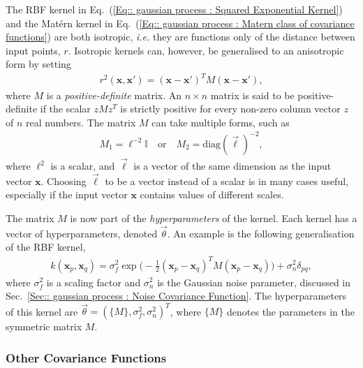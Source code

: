 \documentclass[twoside,english]{uiofysmaster}
\begin{document}
{{The RBF kernel in Eq.~(\ref{Eq:: gaussian process : Squared Exponential Kernel}) and the Mat\'{e}rn kernel in Eq.~(\ref{Eq:: gaussian process : Matern class of covariance functions}) are both isotropic, \textit{i.e.} they are functions only of the distance between input points, $r$. Isotropic kernels can, however, be generalised to an anisotropic form by setting
\begin{align}
r^2(\textbf{x}, \textbf{x}') = (\textbf{x} - \textbf{x}')^T M(\textbf{x} - \textbf{x}'),
\end{align}
where $M$ is a \textit{positive-definite} matrix. An $n \times n$ matrix is said to be positive-definite if the scalar $zMz^T$ is strictly positive for every non-zero column vector $z$ of $n$ real numbers. The matrix $M$ can take multiple forms, such as 
\begin{align}
M_1 = \ell^{-2} \mathbb{I} \quad \mathrm{or} \quad M_2 = \text{diag}(\vec{\ell})^{-2},
\end{align}
where $\ell^2$ is a scalar, and $\vec{\ell}$ is a vector of the same dimension as the input vector $\textbf{x}$. Choosing $\vec{\ell}$ to be a vector instead of a scalar is in many cases useful, especially if the input vector $\textbf{x}$ contains values of different scales.

The matrix $M$ is now part of the \textit{hyperparameters} of the kernel. Each kernel has a vector of hyperparameters, denoted $\vec{\theta}$. An example is the following generalisation of the RBF kernel, 
\begin{align}\label{Eq:: gaussian process : General RBF kernel}
k(\textbf{x}_p, \textbf{x}_q) = \sigma_f^2 \exp \big(- \frac{1}{2} (\textbf{x}_p - \textbf{x}_q)^T M (\textbf{x}_p - \textbf{x}_q) \big) + \sigma_n^2 \delta_{pq},
\end{align}
where $\sigma_f^2$ is a scaling factor and $\sigma_n^2$ is the Gaussian noise parameter, discussed in Sec.~\ref{Sec:: gaussian process : Noise Covariance Function}. The hyperparameters of this kernel are $\vec{\theta} = (\{M\}, \sigma^2_f, \sigma_n^2)^T$, where $\{M\}$ denotes the parameters in the symmetric matrix $M$. 

\subsubsection{Other Covariance Functions}

}}
\end{document}
